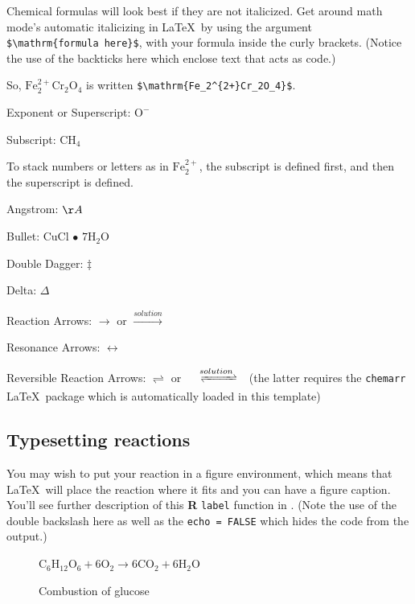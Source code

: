 \documentclass[12pt,twoside]{reedthesis}
\begin{document}
  Chemical formulas will look best if they are not italicized. Get around
  math mode's automatic italicizing in \LaTeX~by using the argument
  \texttt{\$\textbackslash{}mathrm\{formula\ here\}\$}, with your formula
  inside the curly brackets. (Notice the use of the backticks here which
  enclose text that acts as code.)
  
  So, \(\mathrm{Fe_2^{2+}Cr_2O_4}\) is written
  \texttt{\$\textbackslash{}mathrm\{Fe\_2\^{}\{2+\}Cr\_2O\_4\}\$}.
  
  \noindent Exponent or Superscript: \(\mathrm{O^-}\)
  
  \noindent Subscript: \(\mathrm{CH_4}\)
  
  To stack numbers or letters as in \(\mathrm{Fe_2^{2+}}\), the subscript
  is defined first, and then the superscript is defined.
  
  \noindent Angstrom: \({\AA}\)
  
  \noindent Bullet: CuCl \(\bullet\) \(\mathrm{7H_{2}O}\)
  
  \noindent Double Dagger: \(\ddag\)
  
  \noindent Delta: \(\Delta\)
  
  \noindent Reaction Arrows: \(\longrightarrow\) or
  \(\xrightarrow{solution}\)
  
  \noindent Resonance Arrows: \(\leftrightarrow\)
  
  \noindent Reversible Reaction Arrows: \(\rightleftharpoons\) or
  \(\xrightleftharpoons[ ]{solution}\) (the latter requires the
  \texttt{chemarr} \LaTeX~package which is automatically loaded in this
  template)
  
  \subsection{Typesetting reactions}\label{typesetting-reactions}
  
  You may wish to put your reaction in a figure environment, which means
  that \LaTeX~will place the reaction where it fits and you can have a
  figure caption. You'll see further description of this \textbf{R}
  \texttt{label} function in \protect\hyperlink{ref_labels}{}. (Note the
  use of the double backslash here as well as the \texttt{echo\ =\ FALSE}
  which hides the code from the output.)
  
  \begin{figure}[h!tbp]
  \begin{center}
  $\mathrm{C_6H_{12}O_6  + 6O_2} \longrightarrow \mathrm{6CO_2 + 6H_2O}$
  \caption{Combustion of glucose}
  \label{fig:comb-gluc}
  \end{center}
  \end{figure}
  
\end{document}
